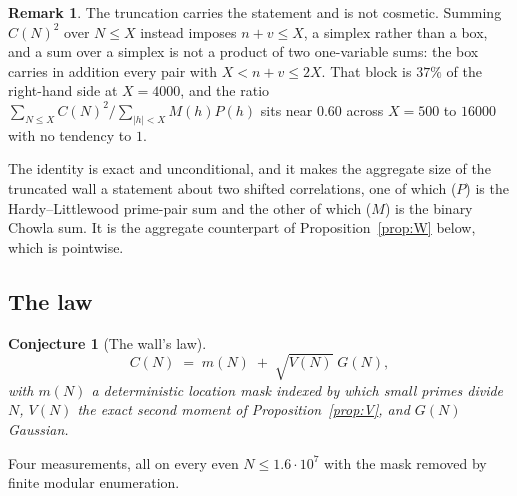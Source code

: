 \documentclass[11pt,a4paper]{article}
\theoremstyle{plain}
\newtheorem{conjecture}[theorem]{Conjecture}
\theoremstyle{definition}
\newtheorem{remark}[theorem]{Remark}
\begin{document}
\begin{remark}
The truncation carries the statement and is not cosmetic. Summing
$C(N)^2$ over $N\le X$ instead imposes $n+v\le X$, a simplex rather
than a box, and a sum over a simplex is not a product of two
one-variable sums: the box carries in addition every pair with
$X < n+v \le 2X$. That block is $37\%$ of the right-hand side at
$X = 4000$, and the ratio
$\sum_{N\le X}C(N)^2 \big/ \sum_{|h|<X}M(h)P(h)$ sits near $0.60$
across $X = 500$ to $16000$ with no tendency to $1$.
\end{remark}

The identity is exact and unconditional, and it makes the aggregate
size of the truncated wall a statement about two shifted correlations,
one of
which ($P$) is the Hardy--Littlewood prime-pair sum and the other of
which ($M$) is the binary Chowla sum. It is the aggregate counterpart
of Proposition~\ref{prop:W} below, which is pointwise.

\subsection{The law}

\begin{conjecture}[The wall's law]\label{conj:wall}
\[
  C(N) \;=\; m(N) \;+\; \sqrt{V(N)}\;G(N),
\]
with $m(N)$ a deterministic \emph{location mask} indexed by which small
primes divide $N$, $V(N)$ the exact second moment of
Proposition~\ref{prop:V}, and $G(N)$ Gaussian.
\end{conjecture}

Four measurements, all on every even $N\le1.6\cdot10^7$ with the mask
removed by finite modular enumeration.
\end{document}
